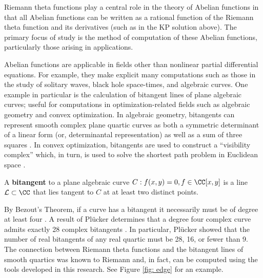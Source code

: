 Riemann theta functions play a central role in the theory of Abelian
functions in that all Abelian functions can be written as a rational
function of the Riemann theta function and its derivatives (such as in
the KP solution above).  The primary focus of study is the method of
computation of these Abelian functions, particularly those arising in
applications.

Abelian functions are applicable in fields other than nonlinear partial
differential equations. For example, they make explicit many
computations such as those in the study of solitary waves, black hole
space-times, and algebraic curves. One example in particular is the
calculation of bitangent lines of plane algebraic curves; useful for
computations in optimization-related fields such as algebraic geometry
and convex optimization. In algebraic geometry, bitangents can represent
smooth complex plane quartic curves as both a symmetric determinant of a
linear form (or, determinantal representation) as well as a sum of three
squares \cite{PSV11}. In convex optimization, bitangents are used to
construct a ``visibility complex'' which, in turn, is used to solve the
shortest path problem in Euclidean space \cite{PocchiolaVegter93}.

\begin{definition} \label{def: bitangent}
  A {\bf bitangent} to a plane algebraic curve $C : f(x,y) = 0, f \in
  \CC[x,y]$ is a line $\mathcal{L} \subset \CC$ that lies tangent to $C$
  at at least two distinct points.
\end{definition}

By Bezout's Theorem, if a curve has a bitangent it necessarily must be
of degree at least four \cite{Bezout1779}. A result of Pl\"{u}cker
determines that a degree four complex curve admits exactly 28 complex
bitangents \cite{Plucker34}. In particular, Pl\"{u}cker showed that the
number of real bitangents of any real quartic must be 28, 16, or fewer
than 9. The connection between Riemann theta functions and the bitangent
lines of smooth quartics was known to Riemann \cite{Riemann76,Baker97}
and, in fact, can be computed using the tools developed in this
research. See Figure \ref{fig: edge} for an example.


